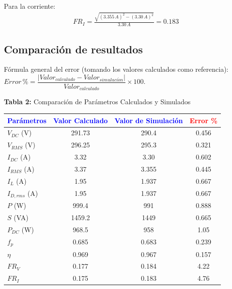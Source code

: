 \documentclass[11pt]{article}
\begin{document}
Para la corriente:
\begin{align*}
FR_I = \frac{\sqrt{(3.355\,A)^2 - (3.30\,A)^2}}{3.30\,A} = \boxed{0.183}
\end{align*}

\subsection{Comparaci\'on de resultados}

F\'ormula general del error (tomando los valores calculados como referencia):
$Error\,\% = \dfrac{|Valor_{calculado} - Valor_{simulaci\acute{o}n}|}{Valor_{calculado}}\times 100$.

\begin{center}
\textbf{Tabla 2:} Comparaci\'on de Par\'ametros Calculados y Simulados

\medskip
\begin{tabular}{|l|c|c|c|}
\hline
\textbf{\textcolor{blue}{Par\'ametros}} & \textbf{\textcolor{blue}{Valor Calculado}} & \textbf{\textcolor{blue}{Valor de Simulaci\'on}} & \textbf{\textcolor{red}{Error \%}} \\ \hline
$V_{DC}$ (V) & 291.73 & 290.4 & 0.456 \\
$V_{RMS}$ (V) & 296.25 & 295.3 & 0.321 \\
$I_{DC}$ (A) & 3.32 & 3.30 & 0.602 \\
$I_{RMS}$ (A) & 3.37 & 3.355 & 0.445 \\
$I_L$ (A) & 1.95 & 1.937 & 0.667 \\
$I_{D,rms}$ (A) & 1.95 & 1.937 & 0.667 \\
$P$ (W) & 999.4 & 991 & 0.888 \\
$S$ (VA) & 1459.2 & 1449 & 0.665 \\
$P_{DC}$ (W) & 968.5 & 958 & 1.05 \\
$f_p$ & 0.685 & 0.683 & 0.239 \\
$\eta$ & 0.969 & 0.967 & 0.157 \\
$FR_V$ & 0.177 & 0.184 & 4.22 \\
$FR_I$ & 0.175 & 0.183 & 4.76 \\ \hline
\end{tabular}
\end{center}
\end{document}
